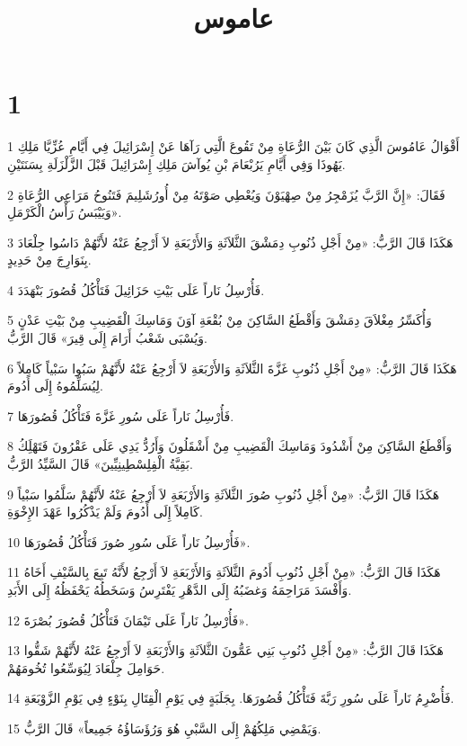

\title{عاموس}


\chapter{1}

\par 1 أَقْوَالُ عَامُوسَ الَّذِي كَانَ بَيْنَ الرُّعَاةِ مِنْ تَقُوعَ الَّتِي رَآهَا عَنْ إِسْرَائِيلَ فِي أَيَّامِ عُزِّيَّا مَلِكِ يَهُوذَا وَفِي أَيَّامِ يَرُبْعَامَ بْنِ يُوآشَ مَلِكِ إِسْرَائِيلَ قَبْلَ الزَّلْزَلَةِ بِسَنَتَيْنِ.
\par 2 فَقَالَ: «إِنَّ الرَّبَّ يُزَمْجِرُ مِنْ صِهْيَوْنَ وَيُعْطِي صَوْتَهُ مِنْ أُورُشَلِيمَ فَتَنُوحُ مَرَاعِي الرُّعَاةِ وَيَيْبَسُ رَأْسُ الْكَرْمَلِ».
\par 3 هَكَذَا قَالَ الرَّبُّ: «مِنْ أَجْلِ ذُنُوبِ دِمَشْقَ الثَّلاَثَةِ وَالأَرْبَعَةِ لاَ أَرْجِعُ عَنْهُ لأَنَّهُمْ دَاسُوا جِلْعَادَ بِنَوَارِجَ مِنْ حَدِيدٍ.
\par 4 فَأُرْسِلُ نَاراً عَلَى بَيْتِ حَزَائِيلَ فَتَأْكُلُ قُصُورَ بَنْهَدَدَ.
\par 5 وَأُكَسِّرُ مِغْلاَقَ دِمَشْقَ وَأَقْطَعُ السَّاكِنَ مِنْ بُقْعَةِ آوَنَ وَمَاسِكَ الْقَضِيبِ مِنْ بَيْتِ عَدْنٍ وَيُسْبَى شَعْبُ أَرَامَ إِلَى قِيرَ» قَالَ الرَّبُّ.
\par 6 هَكَذَا قَالَ الرَّبُّ: «مِنْ أَجْلِ ذُنُوبِ غَزَّةَ الثَّلاَثَةِ وَالأَرْبَعَةِ لاَ أَرْجِعُ عَنْهُ لأَنَّهُمْ سَبُوا سَبْياً كَامِلاً لِيُسَلِّمُوهُ إِلَى أَدُومَ.
\par 7 فَأُرْسِلُ نَاراً عَلَى سُورِ غَزَّةَ فَتَأْكُلُ قُصُورَهَا.
\par 8 وَأَقْطَعُ السَّاكِنَ مِنْ أَشْدُودَ وَمَاسِكَ الْقَضِيبِ مِنْ أَشْقَلُونَ وَأَرُدُّ يَدِي عَلَى عَقْرُونَ فَتَهْلَِكُ بَقِيَّةُ الْفِلِسْطِينِيِّينَ» قَالَ السَّيِّدُ الرَّبُّ.
\par 9 هَكَذَا قَالَ الرَّبُّ: «مِنْ أَجْلِ ذُنُوبِ صُورَ الثَّلاَثَةِ وَالأَرْبَعَةِ لاَ أَرْجِعُ عَنْهُ لأَنَّهُمْ سَلَّمُوا سَبْياً كَامِلاً إِلَى أَدُومَ وَلَمْ يَذْكُرُوا عَهْدَ الإِخْوَةِ.
\par 10 فَأُرْسِلُ نَاراً عَلَى سُورِ صُورَ فَتَأْكُلُ قُصُورَهَا».
\par 11 هَكَذَا قَالَ الرَّبُّ: «مِنْ أَجْلِ ذُنُوبِ أَدُومَ الثَّلاَثَةِ وَالأَرْبَعَةِ لاَ أَرْجِعُ لأَنَّهُ تَبِعَ بِالسَّيْفِ أَخَاهُ وَأَفْسَدَ مَرَاحِمَهُ وَغضَبُهُ إِلَى الدَّهْرِ يَفْتَرِسُ وَسَخَطُهُ يَحْفَظُهُ إِلَى الأَبَدِ.
\par 12 فَأُرْسِلُ نَاراً عَلَى تَيْمَانَ فَتَأْكُلُ قُصُورَ بُصْرَةَ».
\par 13 هَكَذَا قَالَ الرَّبُّ: «مِنْ أَجْلِ ذُنُوبِ بَنِي عَمُّونَ الثَّلاَثَةِ وَالأَرْبَعَةِ لاَ أَرْجِعُ عَنْهُ لأَنَّهُمْ شَقُّوا حَوَامِلَ جِلْعَادَ لِيُوَسِّعُوا تُخُومَهُمْ.
\par 14 فَأُضْرِمُ نَاراً عَلَى سُورِ رَبَّةَ فَتَأْكُلُ قُصُورَهَا. بِجَلَبَةٍ فِي يَوْمِ الْقِتَالِ بِنَوْءٍ فِي يَوْمِ الزَّوْبَعَةِ.
\par 15 وَيَمْضِي مَلِكُهُمْ إِلَى السَّبْيِ هُوَ وَرُؤَسَاؤُهُ جَمِيعاً» قَالَ الرَّبُّ.

